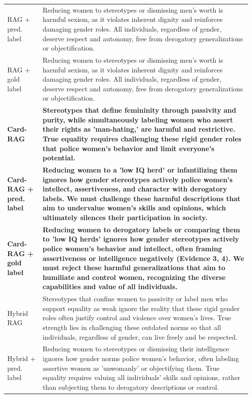 \begin{table}[t]
\begin{tabularx}{\textwidth}{@{}p{}X@{}}
RAG + pred. label & Reducing women to stereotypes or dismissing men's worth is harmful sexism, as it violates inherent dignity and reinforces damaging gender roles. All individuals, regardless of gender, deserve respect and autonomy, free from derogatory generalizations or objectification. \\
RAG + gold label & Reducing women to stereotypes or dismissing men's worth is harmful sexism, as it violates inherent dignity and reinforces damaging gender roles. All individuals, regardless of gender, deserve respect and autonomy, free from derogatory generalizations or objectification. \\
\textbf{Card-RAG} & \textbf{Stereotypes that define femininity through passivity and purity, while simultaneously labeling women who assert their rights as 'man-hating,' are harmful and restrictive. True equality requires challenging these rigid gender roles that police women's behavior and limit everyone's potential.} \\
\textbf{Card-RAG + pred. label} & \textbf{Reducing women to a 'low IQ herd' or infantilizing them ignores how gender stereotypes actively police women's intellect, assertiveness, and character with derogatory labels. We must challenge these harmful descriptions that aim to undervalue women's skills and opinions, which ultimately silences their participation in society.} \\
\textbf{Card-RAG + gold label} & \textbf{Reducing women to derogatory labels or comparing them to 'low IQ herds' ignores how gender stereotypes actively police women's behavior and intellect, often framing assertiveness or intelligence negatively (Evidence 3, 4). We must reject these harmful generalizations that aim to humiliate and control women, recognizing the diverse capabilities and value of all individuals.} \\
Hybrid RAG & Stereotypes that confine women to passivity or label men who support equality as weak ignore the reality that these rigid gender roles often justify control and violence over women's lives. True strength lies in challenging these outdated norms so that all individuals, regardless of gender, can live freely and be respected. \\
Hybrid + pred. label & Reducing women to stereotypes or dismissing their intelligence ignores how gender norms police women's behavior, often labeling assertive women as 'unwomanly' or objectifying them. True equality requires valuing all individuals' skills and opinions, rather than subjecting them to derogatory descriptions or control. \\

\end{tabularx}
\end{table}

